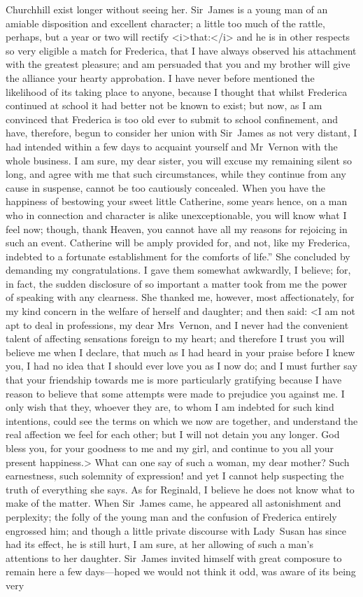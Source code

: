 \begin{mail}{Churchhill}{}
exist longer without seeing her. Sir~James is a young man of an amiable disposition and excellent character; a little too much of the rattle, perhaps, but a year or two will rectify <i>that:</i> and he is in other respects so very eligible a match for Frederica, that I have always observed his attachment with the greatest pleasure; and am persuaded that you and my brother will give the alliance your hearty approbation. I have never before mentioned the likelihood of its taking place to anyone, because I thought that whilst Frederica continued at school it had better not be known to exist; but now, as I am convinced that Frederica is too old ever to submit to school confinement, and have, therefore, begun to consider her union with Sir~James as not very distant, I had intended within a few days to acquaint yourself and Mr~Vernon with the whole business. I am sure, my dear sister, you will excuse my remaining silent so long, and agree with me that such circumstances, while they continue from any cause in suspense, cannot be too cautiously concealed. When you have the happiness of bestowing your sweet little Catherine, some years hence, on a man who in connection and character is alike unexceptionable, you will know what I feel now; though, thank Heaven, you cannot have all my reasons for rejoicing in such an event. Catherine will be amply provided for, and not, like my Frederica, indebted to a fortunate establishment for the comforts of life.” She concluded by demanding my congratulations. I gave them somewhat awkwardly, I believe; for, in fact, the sudden disclosure of so important a matter took from me the power of speaking with any clearness. She thanked me, however, most affectionately, for my kind concern in the welfare of herself and daughter; and then said: <I am not apt to deal in professions, my dear Mrs~Vernon, and I never had the convenient talent of affecting sensations foreign to my heart; and therefore I trust you will believe me when I declare, that much as I had heard in your praise before I knew you, I had no idea that I should ever love you as I now do; and I must further say that your friendship towards me is more particularly gratifying because I have reason to believe that some attempts were made to prejudice you against me. I only wish that they, whoever they are, to whom I am indebted for such kind intentions, could see the terms on which we now are together, and understand the real affection we feel for each other; but I will not detain you any longer. God bless you, for your goodness to me and my girl, and continue to you all your present happiness.> What can one say of such a woman, my dear mother? Such earnestness, such solemnity of expression! and yet I cannot help suspecting the truth of everything she says. As for Reginald, I believe he does not know what to make of the matter. When Sir~James came, he appeared all astonishment and perplexity; the folly of the young man and the confusion of Frederica entirely engrossed him; and though a little private discourse with Lady~Susan has since had its effect, he is still hurt, I am sure, at her allowing of such a man's attentions to her daughter. Sir~James invited himself with great composure to remain here a few days—hoped we would not think it odd, was aware of its being very 
\end{mail}
